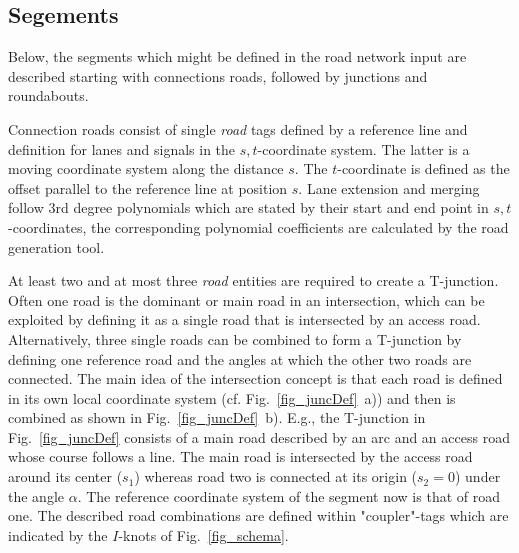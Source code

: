 \documentclass[a4paper, 10pt, conference]{ieeeconf}      %
\begin{document}
\subsection{Segements}\label{sec_segments}
Below, the segments which might be defined in the road network input are described starting with connections roads, followed by junctions and roundabouts.

Connection roads consist of single \textit{road} tags defined by a reference line and definition for lanes and signals in the $s,t$-coordinate system. The latter is a moving coordinate system along the distance $s$. The $t$-coordinate is defined as the offset parallel to the reference line at position $s$. Lane extension and merging follow 3rd degree polynomials which are stated by their start and end point in $s,t$-coordinates, the corresponding polynomial coefficients are calculated by the road generation tool.

At least two and at most three \textit{road} entities are required to create a T-junction. Often one road is the dominant or main road in an intersection, which can be exploited by defining it as a single road that is intersected by an access road. Alternatively, three single roads can be combined to form a T-junction by defining one reference road and the angles at which the other two roads are connected. The main idea of the intersection concept is that each road is defined in its own local coordinate system (cf. Fig.~\ref{fig_juncDef}~a)) and then is combined as shown in Fig.~\ref{fig_juncDef}~b). E.g., the T-junction in Fig.~\ref{fig_juncDef} consists of a main road described by an arc and an access road whose course follows a line. The main road is intersected by the access road around its center ($s_1$) whereas road two is connected at its origin ($s_2=0$) under the angle $\alpha$. The reference coordinate system of the segment now is that of road one. The described road combinations are defined within "coupler"-tags which are indicated by the $I$-knots of Fig.~\ref{fig_schema}.
\end{document}
